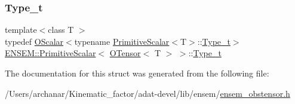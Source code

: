 \subsubsection{\texorpdfstring{Type\_t}{Type\_t}\hspace{0.1cm}{\footnotesize\ttfamily [3/3]}}
{\footnotesize\ttfamily template$<$class T $>$ \\
typedef \mbox{\hyperlink{classENSEM_1_1OScalar}{O\+Scalar}}$<$typename \mbox{\hyperlink{structENSEM_1_1PrimitiveScalar}{Primitive\+Scalar}}$<$T$>$\+::\mbox{\hyperlink{structENSEM_1_1PrimitiveScalar_3_01OTensor_3_01T_01_4_01_4_ac573a5e5194a65a39e552fdebda4994c}{Type\+\_\+t}}$>$ \mbox{\hyperlink{structENSEM_1_1PrimitiveScalar}{E\+N\+S\+E\+M\+::\+Primitive\+Scalar}}$<$ \mbox{\hyperlink{classENSEM_1_1OTensor}{O\+Tensor}}$<$ T $>$ $>$\+::\mbox{\hyperlink{structENSEM_1_1PrimitiveScalar_3_01OTensor_3_01T_01_4_01_4_ac573a5e5194a65a39e552fdebda4994c}{Type\+\_\+t}}}



The documentation for this struct was generated from the following file\+:\begin{DoxyCompactItemize}
\item 
/\+Users/archanar/\+Kinematic\+\_\+factor/adat-\/devel/lib/ensem/\mbox{\hyperlink{adat-devel_2lib_2ensem_2ensem__obstensor_8h}{ensem\+\_\+obstensor.\+h}}\end{DoxyCompactItemize}
